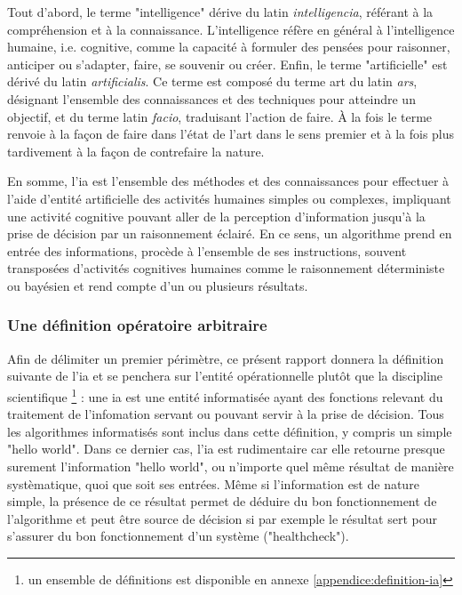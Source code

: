 Tout d'abord, le terme "intelligence" dérive du latin \textit{intelligencia}, référant à la compréhension et à la connaissance. L'intelligence réfère en général à l'intelligence humaine, i.e. cognitive, comme la capacité à formuler des pensées pour raisonner, anticiper ou s'adapter, faire, se souvenir ou créer.
Enfin, le terme "artificielle" est dérivé du latin \textit{artificialis}. Ce terme est composé du terme art du latin \textit{ars}, désignant l'ensemble des connaissances et des techniques pour atteindre un objectif, et du terme latin \textit{facio}, traduisant l'action de faire. À la fois le terme renvoie à la façon de faire dans l'état de l'art dans le sens premier et à la fois plus tardivement à la façon de contrefaire la nature.

En somme, l'\gls{ia} est l'ensemble des méthodes et des connaissances pour effectuer à l'aide d'entité artificielle des activités humaines simples ou complexes, impliquant une activité cognitive pouvant aller de la perception d'information jusqu'à la prise de décision par un raisonnement éclairé. En ce sens, un algorithme prend en entrée des informations, procède à l'ensemble de ses instructions, souvent transposées d'activités cognitives humaines comme le raisonnement déterministe ou bayésien et rend compte d'un ou plusieurs résultats.

\subsubsection{Une définition opératoire arbitraire}
Afin de délimiter un premier périmètre, ce présent rapport donnera la définition suivante de l'\gls{ia} et se penchera sur l'entité opérationnelle plutôt que la discipline scientifique \footnote{un ensemble de définitions est disponible en annexe \ref{appendice:definition-ia}} : une \gls{ia} est une entité informatisée ayant des fonctions relevant du traitement de l'infomation servant ou pouvant servir à la prise de décision. Tous les algorithmes informatisés sont inclus dans cette définition, y compris un simple "hello world". Dans ce dernier cas, l'\gls{ia} est rudimentaire car elle retourne presque surement l'information "hello world", ou n'importe quel même résultat de manière systèmatique, quoi que soit ses entrées. Même si l'information est de nature simple, la présence de ce résultat permet de déduire du bon fonctionnement de l'algorithme et peut être source de décision si par exemple le résultat sert pour s'assurer du bon fonctionnement d'un système ("healthcheck").


